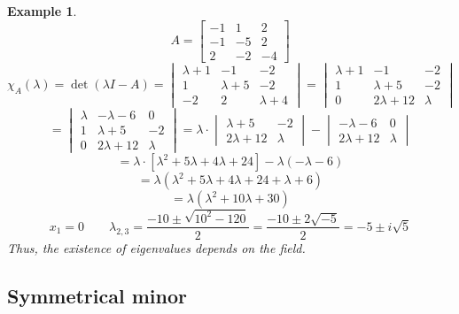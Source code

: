 \documentclass{article}
\newtheorem{example}{Example}  \numberwithin{example}{section}
\begin{document}
\begin{example} %
  \[
    A = \begin{bmatrix}
      -1 & 1 & 2 \\
      -1 & -5 & 2 \\
      2 & -2 & -4
    \end{bmatrix}
  \]
  \[
    \chi_A(\lambda) = \det(\lambda I - A)
    = \begin{vmatrix}
      \lambda + 1 & -1 & -2 \\
      1 & \lambda + 5 & -2 \\
      -2 & 2 & \lambda+4
    \end{vmatrix}
    = \begin{vmatrix}
      \lambda+1 & -1 & -2 \\
      1 & \lambda+5 & -2 \\
      0 & 2\lambda+12 & \lambda
    \end{vmatrix}
  \] \[
    = \begin{vmatrix}
      \lambda & -\lambda-6 & 0 \\
      1 & \lambda+5 & -2 \\
      0 & 2\lambda+12 & \lambda
    \end{vmatrix} = \lambda \cdot \begin{vmatrix}
      \lambda+5 & -2 \\
      2\lambda+12 & \lambda
    \end{vmatrix}
    - \begin{vmatrix}
      -\lambda - 6 & 0 \\
      2\lambda+12 & \lambda
    \end{vmatrix}
  \] \[
    = \lambda \cdot [\lambda^2 + 5\lambda + 4\lambda + 24] - \lambda(-\lambda-6)
  \] \[
    = \lambda(\lambda^2 + 5\lambda + 4\lambda + 24 + \lambda + 6)
  \] \[
    = \lambda(\lambda^2 + 10\lambda + 30)
  \] \[
    x_1 = 0 \qquad \lambda_{2,3} = \frac{-10 \pm \sqrt{10^2 - 120}}{2} = \frac{-10 \pm 2\sqrt{-5}}{2} = -5 \pm i\sqrt{5}
  \]
  Thus, the existence of eigenvalues depends on the field.
\end{example}

\subsection{Symmetrical minor}
\end{document}
